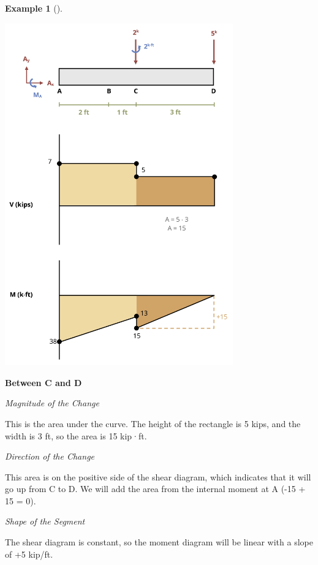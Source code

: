 \documentclass[
  letterpaper,
  DIV=11,
  numbers=noendperiod]{scrreprt}
\theoremstyle{definition}
\newtheorem{example}{Example}[chapter]
\theoremstyle{remark}
\begin{document}
\begin{tcolorbox}
\begin{example}[]
\begin{tcolorbox}
\begin{center}
\includegraphics[width=3.875in,height=\textheight]{images/CH7 PNGs/example 7.4 part 6.png}
\end{center}

\textbf{Between C and D}

\emph{Magnitude of the Change}

This is the area under the curve. The height of the rectangle is 5 kips,
and the width is 3 ft, so the area is 15 kip·ft.

\emph{Direction of the Change}

This area is on the positive side of the shear diagram, which indicates
that it will go up from C to D. We will add the area from the internal
moment at A (-15 + 15 = 0).

\emph{Shape of the Segment}

The shear diagram is constant, so the moment diagram will be linear with
a slope of +5 kip/ft.


\end{tcolorbox}
\end{example}
\end{tcolorbox}
\end{document}
